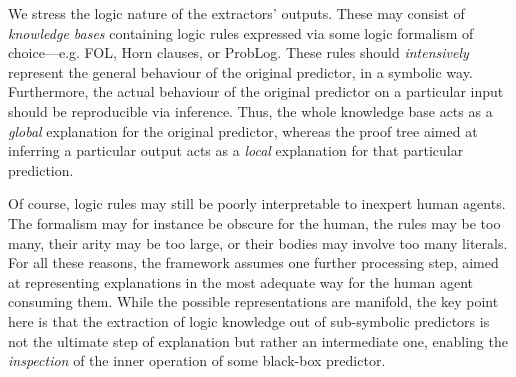 \documentclass[12pt,a4paper,openright,twoside]{book}
\begin{document}
We stress the logic nature of the extractors' outputs.
%
These may consist of \emph{knowledge bases} containing logic rules expressed via some logic formalism of choice---e.g. FOL, Horn clauses, or ProbLog.
%
These rules should \emph{intensively} represent the general behaviour of the original predictor, in a symbolic way.
%
Furthermore, the actual behaviour of the original predictor on a particular input should be reproducible via inference.
%
Thus, the whole knowledge base acts as a \emph{global} explanation for the original predictor, whereas the proof tree aimed at inferring a particular output acts as a \emph{local} explanation for that particular prediction.

Of course, logic rules may still be poorly interpretable to inexpert human agents.
%
The formalism may for instance be obscure for the human, the rules may be too many, their arity may be too large, or their bodies may involve too many literals.
%
For all these reasons, the framework assumes one further processing step, aimed at representing explanations in the most adequate way for the human agent consuming them.
%
While the possible representations are manifold, the key point here is that the extraction of logic knowledge out of sub-symbolic predictors is not the ultimate step of explanation but rather an intermediate one, enabling the \emph{inspection} of the inner operation of some black-box predictor.
\end{document}
